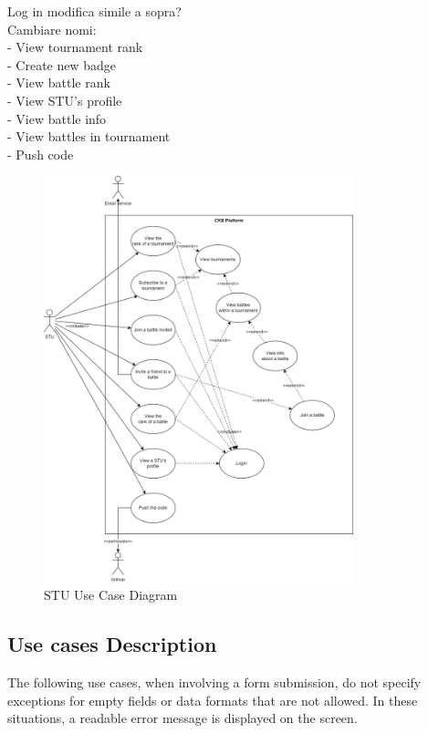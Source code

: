 {\color{red} 
        Log in modifica simile a sopra?\\
        Cambiare nomi: \\
        - View tournament rank \\
        - Create new badge \\
        - View battle rank \\
        - View STU's profile \\
        - View battle info \\
        - View battles in tournament \\ 
        - Push code \\
}
\begin{figure}[H]
    \centering
    \includegraphics[width=0.8\textwidth]{images/sequence_diagrams/use_case_diagrams_STU.png}
    \caption{STU Use Case Diagram}
\end{figure}

\subsection{Use cases Description}
The following use cases, when involving a form submission, do not specify exceptions for empty fields or data formats that are not allowed. 
In these situations, a readable error message is displayed on the screen.

